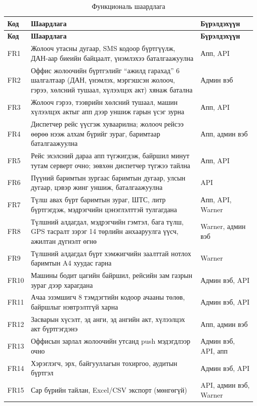 \documentclass[
12pt,
oneside,
english,
onehalfspacing,
nolistspacing,
headsepline,
]{MUST-Thesis}
\begin{document}
{\small
\renewcommand{\arraystretch}{1.2}
\begin{longtable}{|L{1.2cm}|L{9.2cm}|L{3.4cm}|}
\caption{Функциональ шаардлага}\label{tab:ch3-fr}\\
\hline
{}\textbf{Код} & \textbf{Шаардлага} & \textbf{Бүрэлдэхүүн} \\ \hline
\endfirsthead
\hline
{}\textbf{Код} & \textbf{Шаардлага} & \textbf{Бүрэлдэхүүн} \\ \hline
\endhead
FR1 & Жолооч утасны дугаар, SMS кодоор бүртгүүлж, ДАН-аар биеийн байцаалт, үнэмлэхээ баталгаажуулна & Апп, API \\ \hline
FR2 & Оффис жолоочийн бүртгэлийг ``ажилд гарахад'' 6 шалгалтаар (ДАН, үнэмлэх, мэргэшсэн жолооч, гэрээ, хөлсний тушаал, хүлээлцэх акт) хянаж батална & Админ вэб \\ \hline
FR3 & Жолооч гэрээ, тээврийн хөлсний тушаал, машин хүлээлцэх актыг апп дээр уншиж гарын үсэг зурна & Апп, API \\ \hline
FR4 & Диспетчер рейс үүсгэж хуваарилна; жолооч рейсээ өөрөө нээж алхам бүрийг зураг, баримтаар баталгаажуулна & Апп, админ вэб \\ \hline
FR5 & Рейс эхэлсний дараа апп түгжигдэж, байршил минут тутам серверт очно; зөвхөн диспетчер түгжээ тайлна & Апп, API \\ \hline
FR6 & Пүүний баримтын зургаас баримтын дугаар, улсын дугаар, цэвэр жинг уншиж, баталгаажуулна & API \\ \hline
FR7 & Түлш авах бүрт баримтын зураг, ШТС, литр бүртгэгдэж, мэдрэгчийн цэнэглэлттэй тулгагдана & Апп, API, Warner \\ \hline
FR8 & Түлшний алдагдал, мэдрэгчийн гэмтэл, бага түлш, GPS тасралт зэрэг 14 төрлийн анхааруулга үүсч, ажилтан дүгнэлт өгнө & Warner, админ вэб \\ \hline
FR9 & Түлшний алдагдал бүрт хэмжигчийн заалттай нотлох баримтын A4 хуудас гарна & Warner \\ \hline
FR10 & Машины бодит цагийн байршил, рейсийн зам газрын зураг дээр харагдана & Админ вэб, API \\ \hline
FR11 & Ачаа эзэмшигч 8 тэмдэгтийн кодоор ачааны төлөв, байршлыг нэвтрэлтгүй харна & Админ вэб, API \\ \hline
FR12 & Засварын хүсэлт, эд анги, эд ангийн акт, хүлээлцэх акт бүртгэгдэнэ & Апп, админ вэб \\ \hline
FR13 & Оффисын зарлал жолоочийн утсанд push мэдэгдлээр очно & Админ вэб, API, апп \\ \hline
FR14 & Хэрэглэгч, эрх, байгууллагын тохиргоо, аудитын бүртгэл & Админ вэб, API \\ \hline
FR15 & Сар бүрийн тайлан, Excel/CSV экспорт (мөнгөгүй) & API, админ вэб, Warner \\ \hline
\end{longtable}
}
\end{document}
